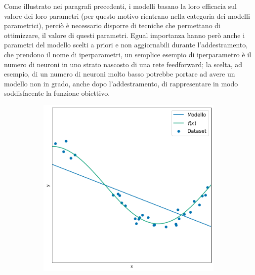 \documentclass[../../main.tex]{subfiles}
\begin{document}
Come illustrato nei paragrafi precedenti, i modelli basano la loro efficacia sul valore dei loro parametri (per questo motivo rientrano nella categoria dei modelli parametrici), perciò è necessario disporre di tecniche che permettano di ottimizzare, il valore di questi parametri. Egual importanza hanno però anche i parametri del modello scelti a priori e non aggiornabili durante l'addestramento, che prendono il nome di iperparametri, un semplice esempio di iperparametro è il numero di neuroni in uno strato nascosto di una rete feedforward; la scelta, ad esempio, di un numero di neuroni molto basso potrebbe portare ad avere un modello non in grado, anche dopo l'addestramento, di rappresentare in modo soddisfacente la funzione obiettivo.

\begin{figure}[H]
    \centering
    \begin{subfigure}[t]{0.30\textwidth}
        \centering
        \includegraphics[width=\textwidth]{immagini/4_2/4_2_3/under.png}
        \caption{}
        \label{fig:underfitting}
    \end{subfigure}
    \begin{subfigure}[t]{0.30\textwidth}
        \centering

\end{subfigure}
\end{figure}
\end{document}
